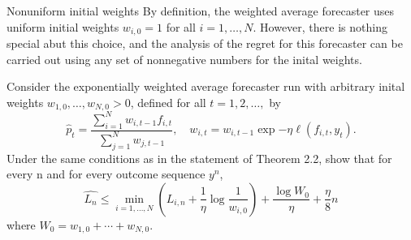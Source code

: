 \begin{exercise}[]{Nonuniform initial weights}
	By definition, the weighted average forecaster uses uniform initial weights $ w_{i,0}=1 $ for all $ i=1,\ldots,N $. However, there is nothing special abut this choice, and the analysis of the regret for this forecaster can be carried out using any set of nonnegative numbers for the inital weights.

Consider the exponentially weighted average forecaster run with arbitrary inital weights $ w_{1,0},\ldots,w_{N,0} >0 $, defined for all $ t=1,2,\ldots, $ by
\begin{equation*}
	\hat{p}_t = \frac{\sum_{i=1}^{N}w_{i,t-1}f_{i,t}}{\sum_{j=1}^{N}w_{j,t-1}}, \quad w_{i,t} = w_{i,t-1} \exp{-\eta\ell(f_{i,t},y_t)}.
\end{equation*}
Under the same conditions as in the statement of Theorem 2.2, show that for every n and for every outcome sequence $ y^{n} $,
\begin{equation*}
	\widehat{L_n} \leq \min_{i=1,\ldots,N} \left( L_{i,n} + \frac{1}{\eta}\log \frac{1}{w_{i,0}} \right) + \frac{\log W_0}{\eta} + \frac{\eta}{8}n
\end{equation*}
where $ W_0 = w_{1,0} + \cdots + w_{N,0} $.
\end{exercise}

